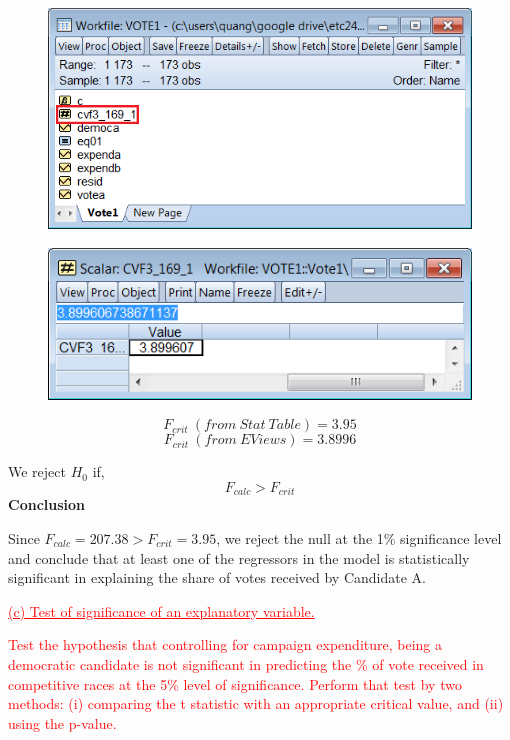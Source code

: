 \documentclass[12pt]{report}
\begin{document}
\vspace{-\baselineskip}
\begin{figure}[H]
	\centering
	\includegraphics{q1_7}
\end{figure}
\vspace{-\baselineskip}
\begin{figure}[H]
	\centering
	\includegraphics{q1_8}
\end{figure}
\vspace{-\baselineskip}
$$F_{crit}\ (from\ Stat\ Table) = 3.95$$
$$F_{crit}\ (from\ EViews) = 3.8996$$

\noindent We reject $H_0$ if,
$$F_{calc} > F_{crit}$$
\noindent \textbf{Conclusion}

\noindent Since $F_{calc}=207.38>F_{crit}=3.95$, we reject the null at the 1\% significance level and conclude that at least one of the regressors in the model is statistically significant in explaining the share of votes received by Candidate A.

\newpage
\noindent \textcolor{red}
{
	\uline{(c) Test of significance of an explanatory variable.}
}

\noindent \textcolor{red}
{
	Test the hypothesis that controlling for campaign expenditure, being a democratic candidate is not significant in predicting the \% of vote received in competitive races at the 5\% level of significance. Perform that test by two methods: 
	(i) comparing the t statistic with an appropriate critical value, and 
	(ii) using the p-value.
}
\end{document}
